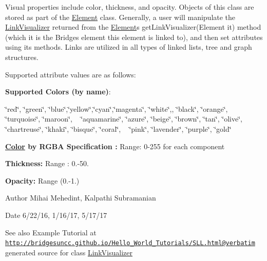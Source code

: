 Visual properties include color, thickness, and opacity. Objects of this class are stored as part of the \hyperlink{namespace_element}{Element} class. Generally, a user will manipulate the \hyperlink{class_link_visualizer_1_1_link_visualizer}{Link\+Visualizer} returned from the \hyperlink{namespace_element}{Element}\textquotesingle{}s get\+Link\+Visualizer(\+Element it) method (which it is the Bridges element this element is linked to), and then set attributes using its methods. Links are utilized in all types of linked lists, tree and graph structures.

Supported attribute values are as follows\+:

{\bfseries Supported Colors (by name)}\+: 

\char`\"{}red\char`\"{}, \char`\"{}green\char`\"{}, \char`\"{}blue\char`\"{},\char`\"{}yellow\char`\"{},\char`\"{}cyan\char`\"{},\char`\"{}magenta\char`\"{}, \char`\"{}white\char`\"{},, \char`\"{}black\char`\"{}, \char`\"{}orange\char`\"{}, \char`\"{}turquoise\char`\"{}, \char`\"{}maroon\char`\"{}, ~\newline
 \char`\"{}aquamarine\char`\"{}, \char`\"{}azure\char`\"{}, \char`\"{}beige\char`\"{}, \char`\"{}brown\char`\"{}, \char`\"{}tan\char`\"{}, \char`\"{}olive\char`\"{}, \char`\"{}chartreuse\char`\"{}, \char`\"{}khaki\char`\"{}, \char`\"{}bisque\char`\"{}, \char`\"{}coral\char`\"{}, ~\newline
 \char`\"{}pink\char`\"{}, \char`\"{}lavender\char`\"{}, \char`\"{}purple\char`\"{}, \char`\"{}gold\char`\"{} 

{\bfseries  \hyperlink{namespace_color}{Color} by R\+G\+BA Specification \+:} Range\+: 0-\/255 for each component 

{\bfseries  Thickness\+: } Range \+: 0.-\/50.

{\bfseries  Opacity\+: } Range (0.-\/1.) 

\begin{DoxyAuthor}{Author}
Mihai Mehedint, Kalpathi Subramanian
\end{DoxyAuthor}
\begin{DoxyDate}{Date}
6/22/16, 1/16/17, 5/17/17
\end{DoxyDate}
\begin{DoxySeeAlso}{See also}
Example Tutorial at ~\newline
 \href{http://bridgesuncc.github.io/Hello_World_Tutorials/SLL.html@verbatim}{\tt http\+://bridgesuncc.\+github.\+io/\+Hello\+\_\+\+World\+\_\+\+Tutorials/\+S\+L\+L.\+html@verbatim} generated source for class \hyperlink{class_link_visualizer_1_1_link_visualizer}{Link\+Visualizer}  
\end{DoxySeeAlso}



